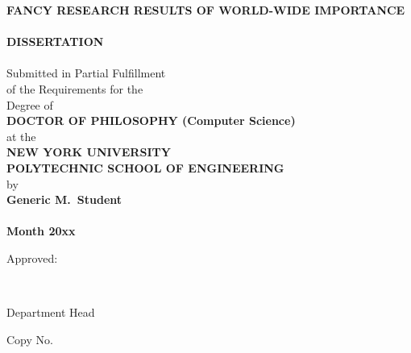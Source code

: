 \thispagestyle{empty}
\begin{center}
{\large
{\bf FANCY RESEARCH RESULTS OF WORLD-WIDE IMPORTANCE}\\
\mbox{} \\
{\huge \bf DISSERTATION}\\
\mbox{} \\
Submitted in Partial Fulfillment\\
of the Requirements for the\\
Degree of\\
{\bf DOCTOR OF PHILOSOPHY (Computer Science)}\\
at the\\
{\bf NEW YORK UNIVERSITY\\POLYTECHNIC SCHOOL OF ENGINEERING}\\
by\\
{\bf Generic M.\ Student}\\
\mbox{} \\
{\bf Month 20xx}}
\end{center}
\vspace{.35 in}
\hspace{4 in} Approved:

\vspace{.2 in}

\hspace{3.35 in} \hrulefill\

\vspace{-.2 in}

\hspace{3.6 in} Department Head

\vspace{.2 in}

\hspace{-.5 in}Copy No. \hrulefill\ \hspace{4 in}

\vspace{-.4 in}

\hspace{3.35 in} \hrulefill\ %


